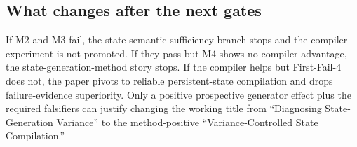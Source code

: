 \subsection{What changes after the next gates}
If M2 and M3 fail, the state-semantic sufficiency branch stops and the compiler experiment is not promoted. If they pass but M4 shows no compiler advantage, the state-generation-method story stops. If the compiler helps but First-Fail-4 does not, the paper pivots to reliable persistent-state compilation and drops failure-evidence superiority. Only a positive prospective generator effect plus the required falsifiers can justify changing the working title from ``Diagnosing State-Generation Variance'' to the method-positive ``Variance-Controlled State Compilation.''
